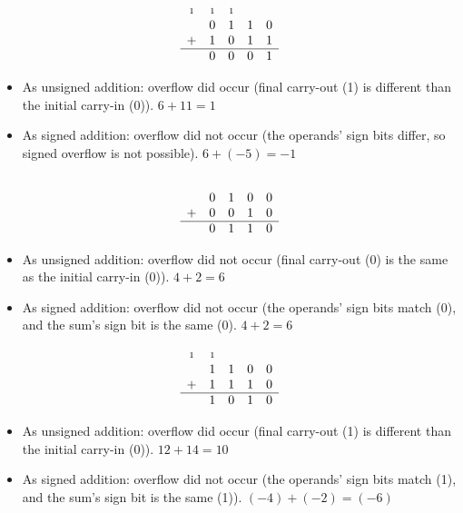 \documentclass{article}
\newcommand{\carry}{\scriptstyle 1}
\begin{document}
\begin{equation*}\begin{array}{ccccc}
 \carry & \carry & \carry & & \\
  & 0 & 1 & 1 & 0 \\
+ & 1 & 0 & 1 & 1 \\ \hline
  & 0 & 0 & 0 & 1
\end{array}\end{equation*}

\begin{itemize}
\item As unsigned addition: overflow did occur (final carry-out (1) is
    different than the initial carry-in (0)). $6+11=1$
\item As signed addition: overflow did not occur (the operands' sign bits
    differ, so signed overflow is not possible). $6+(-5)=-1$
\end{itemize}

\begin{equation*}\begin{array}{ccccc}
  &   &   &   & \\
  & 0 & 1 & 0 & 0 \\
+ & 0 & 0 & 1 & 0 \\ \hline
  & 0 & 1 & 1 & 0
\end{array}\end{equation*}

\begin{itemize}
\item As unsigned addition: overflow did not occur (final carry-out (0) is the
    same as the initial carry-in (0)). $4+2=6$
\item As signed addition: overflow did not occur (the operands' sign bits
    match (0), and the sum's sign bit is the same (0). $4+2=6$
\end{itemize}

\begin{equation*}\begin{array}{ccccc}
 \carry & \carry & & & \\
  & 1 & 1 & 0 & 0 \\
+ & 1 & 1 & 1 & 0 \\ \hline
  & 1 & 0 & 1 & 0
\end{array}\end{equation*}

\begin{itemize}
\item As unsigned addition: overflow did occur (final carry-out (1) is
    different than the initial carry-in (0)). $12+14=10$
\item As signed addition: overflow did not occur (the operands' sign bits
    match (1), and the sum's sign bit is the same (1)). $(-4)+(-2)=(-6)$
\end{itemize}
\end{document}
